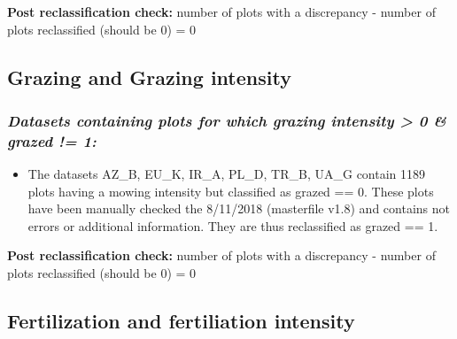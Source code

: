 \documentclass[table]{article}
\newenvironment{Shaded}{\begin{snugshade}}{\end{snugshade}}
\newcommand{\KeywordTok}[1]{\textcolor[rgb]{0.13,0.29,0.53}{\textbf{#1}}}
\newcommand{\DataTypeTok}[1]{\textcolor[rgb]{0.13,0.29,0.53}{#1}}
\newcommand{\DecValTok}[1]{\textcolor[rgb]{0.00,0.00,0.81}{#1}}
\newcommand{\StringTok}[1]{\textcolor[rgb]{0.31,0.60,0.02}{#1}}
\newcommand{\OperatorTok}[1]{\textcolor[rgb]{0.81,0.36,0.00}{\textbf{#1}}}
\newcommand{\NormalTok}[1]{#1}
\providecommand{\tightlist}{%
  \setlength{\itemsep}{0pt}\setlength{\parskip}{0pt}}
\begin{document}
\textbf{Post reclassification check:} number of plots with a discrepancy
- number of plots reclassified (should be 0) = 0

\subsection{Grazing and Grazing
intensity}\label{grazing-and-grazing-intensity}

\subsubsection{\texorpdfstring{\emph{Datasets containing plots for which
grazing intensity \textgreater{} 0 \& grazed !=
1:}}{Datasets containing plots for which grazing intensity \textgreater{} 0 \& grazed != 1:}}\label{datasets-containing-plots-for-which-grazing-intensity-0-grazed-1}

\begin{itemize}
\tightlist
\item
  The datasets AZ\_B, EU\_K, IR\_A, PL\_D, TR\_B, UA\_G contain 1189
  plots having a mowing intensity but classified as grazed == 0. These
  plots have been manually checked the 8/11/2018 (masterfile v1.8) and
  contains not errors or additional information. They are thus
  reclassified as grazed == 1.
\end{itemize}

\begin{Shaded}
\end{Shaded}

\textbf{Post reclassification check:} number of plots with a discrepancy
- number of plots reclassified (should be 0) = 0

\subsection{Fertilization and fertiliation
intensity}\label{fertilization-and-fertiliation-intensity}
\end{document}
